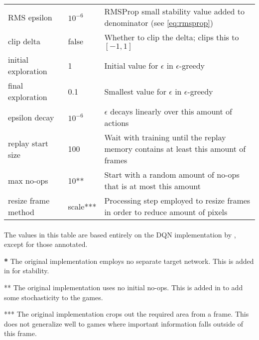 \begin{table}[]
\begin{tabularx}{1.1\linewidth}{ll X}
RMS epsilon                     & $10^{-6}$         & RMSProp small stability value added to denominator (see \ref{eq:rmsprop})                              \\
clip delta                      & false             & Whether to clip the delta; \cite{Mnih2015} clips this to $[-1, 1]$                                      \\
initial exploration             & 1                 & Initial value for $\epsilon$ in $\epsilon$-greedy                                                        \\
final exploration               & 0.1               & Smallest value for $\epsilon$ in $\epsilon$-greedy                                                       \\
epsilon decay                   & $10^{-6}$         & $\epsilon$ decays linearly over this amount of actions                                                   \\
replay start size               & 100               & Wait with training until the replay memory contains at least this amount of frames                       \\
max no-ops                      & 10**              & Start with a random amount of no-ops that is at most this amount                                         \\
resize frame method             & scale***          & Processing step employed to resize frames in order to reduce amount of pixels                            \\
\end{tabularx}
\paragraph{}
  The values in this table are based entirely on the DQN implementation by
  \cite{Mnih2013},
  except for those annotated.

  \textbf{*} The original implementation employs no separate target network.
  This is added in for stability.

  ** The original implementation uses no initial no-ops.
  This is added in to add some stochasticity to the games.

  *** The original implementation crops out the required area from a frame.
  This does not generalize well to games where important information
  falls outside of this frame.
\end{table}

